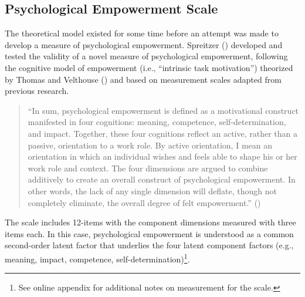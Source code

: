 \documentclass[
  11pt,
  a4paper,
]{article}
\begin{document}
\subsection{Psychological Empowerment
Scale}\label{psychological-empowerment-scale}

The theoretical model existed for some time before an attempt was made
to develop a measure of psychological empowerment. Spreitzer
() developed and tested the validity
of a novel measure of psychological empowerment, following the cognitive
model of empowerment (i.e., ``intrinsic task motivation'') theorized by
Thomas and Velthouse () and based on
measurement scales adapted from previous research.

\begin{quote}
``In sum, psychological empowerment is defined as a motivational
construct manifested in four cognitions: meaning, competence,
self-determination, and impact. Together, these four cognitions reflect
an active, rather than a passive, orientation to a work role. By active
orientation, I mean an orientation in which an individual wishes and
feels able to shape his or her work role and context. The four
dimensions are argued to combine additively to create an overall
construct of psychological empowerment. In other words, the lack of any
single dimension will deflate, though not completely eliminate, the
overall degree of felt empowerment.''
()
\end{quote}

The scale includes 12-items with the component dimensions measured with
three items each. In this case, psychological empowerment is understood
as a common second-order latent factor that underlies the four latent
component factors (e.g., meaning, impact, competence,
self-determination)\footnote{See online appendix for additional notes on
  measurement for the scale.}.
\end{document}
